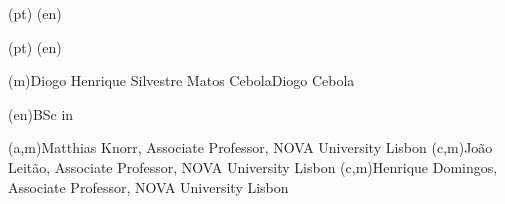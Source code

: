 \ntspecialization(pt){}
\ntspecialization(en){}

\ntsponsors(pt){}
\ntsponsors(en){}

\ntauthorname(m){Diogo Henrique Silvestre Matos Cebola}{Diogo Cebola}

\ntauthordegree(en){BSc in }


(a,m){Matthias Knorr, Associate Professor, NOVA University Lisbon}
(c,m){João Leitão, Associate Professor, NOVA University Lisbon}
(c,m){Henrique Domingos, Associate Professor, NOVA University Lisbon}

